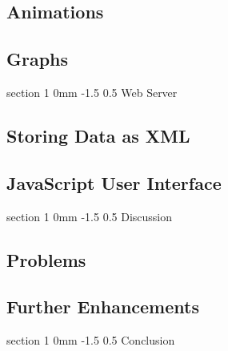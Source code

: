 \documentclass[danish,a4paper,11pt]{article}
\makeatletter
\numberwithin{equation}{section}
\renewcommand{\section}{\@startsection
	{section}%
	{1}%
	{0mm}%
	{-1.5\baselineskip}%
	{0.5\baselineskip}%
	{\normalfont\Large\bfseries}} %
\makeatother
\begin{document}
\subsection{Animations}
\subsection{Graphs}

\section{Web Server}
\subsection{Storing Data as XML}
\subsection{JavaScript User Interface}

\section{Discussion}
\subsection{Problems}
\subsection{Further Enhancements}

\section{Conclusion}
\end{document}
